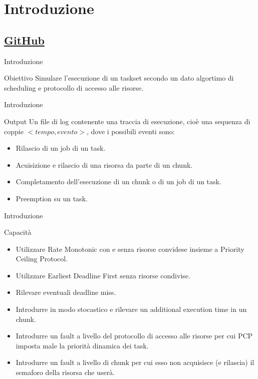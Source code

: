 \section{Introduzione}
\subsection{\href{https://github.com/edoardosarri24/real-time-scheduling-simulator.git}{GitHub}}

\begin{frame}{Introduzione}
    \begin{block}{Obiettivo}
        Simulare l'esecuzione di un taskset secondo un dato algortimo di scheduling e protocollo di accesso alle risorse.
    \end{block}
\end{frame}

\begin{frame}{Introduzione}
    \begin{block}{Output}
        Un file di log contenente una traccia di esecuzione, cioè una sequenza di coppie $<tempo,evento>$, dove i possibili eventi sono:
        \begin{itemize}
            \item Rilascio di un job di un task.
            \item Acuisizione e rilascio di una risorsa da parte di un chunk.
            \item Completamento dell'esecuzione di un chunk o di un job di un task.
            \item Preemption su un task.
        \end{itemize}
    \end{block}
\end{frame}

\begin{frame}{Introduzione}
    \begin{block}{Capacità}
        \begin{itemize}
            \item Utilizzare Rate Monotonic con e senza risorse convidese insieme a Priority Ceiling Protocol.
            \item Utilizzare Earliest Deadline First senza risorse condivise.
            \item Rilevare eventuali deadline miss.
            \item Introdurre in modo stocastico e rilevare un additional execution time in un chunk.
            \item Introdurre un fault a livello del protocollo di accesso alle risorse per cui PCP imposta male la priorità dinamica dei task.
            \item Introdurre un fault a livello di chunk per cui esso non acquisisce (e rilascia) il semaforo della risorsa che userà.
        \end{itemize}
    \end{block}
\end{frame}